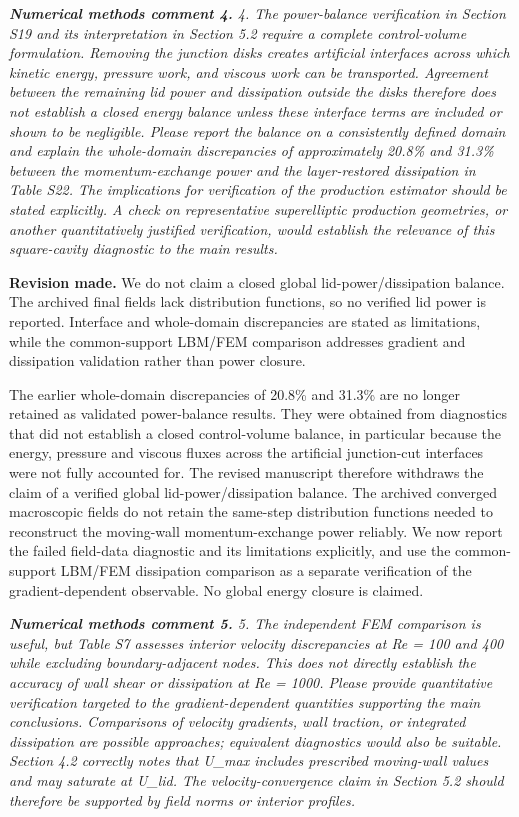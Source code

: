 \documentclass[11pt,a4paper]{article}
\newcommand{\qcomment}[1]{\textcolor{deepblue}{\itshape #1}}
\newcommand{\revwork}[1]{\textbf{\textcolor{revgreen}{#1}}}
\begin{document}
\medskip
\noindent\qcomment{\textbf{Numerical methods comment 4.} 4. The power-balance verification in Section S19 and its interpretation in Section 5.2 require a complete control-volume formulation. Removing the junction disks creates artificial interfaces across which kinetic energy, pressure work, and viscous work can be transported. Agreement between the remaining lid power and dissipation outside the disks therefore does not establish a closed energy balance unless these interface terms are included or shown to be negligible. Please report the balance on a consistently defined domain and explain the whole-domain discrepancies of approximately 20.8\% and 31.3\% between the momentum-exchange power and the layer-restored dissipation in Table S22. The implications for verification of the production estimator should be stated explicitly. A check on representative superelliptic production geometries, or another quantitatively justified verification, would establish the relevance of this square-cavity diagnostic to the main results.}

\noindent\revwork{Revision made.} We do not claim a closed global lid-power/dissipation balance. The archived final fields lack distribution functions, so no verified lid power is reported. Interface and whole-domain discrepancies are stated as limitations, while the common-support LBM/FEM comparison addresses gradient and dissipation validation rather than power closure.

\medskip
\noindent The earlier whole-domain discrepancies of 20.8\% and 31.3\% are no longer retained as validated power-balance results. They were obtained from diagnostics that did not establish a closed control-volume balance, in particular because the energy, pressure and viscous fluxes across the artificial junction-cut interfaces were not fully accounted for. The revised manuscript therefore withdraws the claim of a verified global lid-power/dissipation balance. The archived converged macroscopic fields do not retain the same-step distribution functions needed to reconstruct the moving-wall momentum-exchange power reliably. We now report the failed field-data diagnostic and its limitations explicitly, and use the common-support LBM/FEM dissipation comparison as a separate verification of the gradient-dependent observable. No global energy closure is claimed.

\medskip
\noindent\qcomment{\textbf{Numerical methods comment 5.} 5. The independent FEM comparison is useful, but Table S7 assesses interior velocity discrepancies at Re = 100 and 400 while excluding boundary-adjacent nodes. This does not directly establish the accuracy of wall shear or dissipation at Re = 1000. Please provide quantitative verification targeted to the gradient-dependent quantities supporting the main conclusions. Comparisons of velocity gradients, wall traction, or integrated dissipation are possible approaches; equivalent diagnostics would also be suitable. Section 4.2 correctly notes that U\_max includes prescribed moving-wall values and may saturate at U\_lid. The velocity-convergence claim in Section 5.2 should therefore be supported by field norms or interior profiles.}
\end{document}
